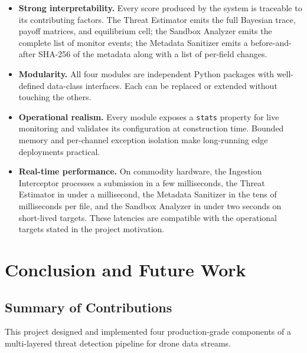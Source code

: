 \documentclass[12pt, a4paper]{report}
\begin{document}
\begin{itemize}
    \item \textbf{Strong interpretability.} Every score produced by the
          system is traceable to its contributing factors. The Threat
          Estimator emits the full Bayesian trace, payoff matrices,
          and equilibrium cell; the Sandbox Analyzer emits the complete
          list of monitor events; the Metadata Sanitizer emits a
          before-and-after SHA-256 of the metadata along with a list of
          per-field changes.
    \item \textbf{Modularity.} All four modules are independent Python
          packages with well-defined data-class interfaces. Each can
          be replaced or extended without touching the others.
    \item \textbf{Operational realism.} Every module exposes a
          \texttt{stats} property for live monitoring and validates its
          configuration at construction time. Bounded memory and
          per-channel exception isolation make long-running edge
          deployments practical.
    \item \textbf{Real-time performance.} On commodity hardware, the
          Ingestion Interceptor processes a submission in a few
          milliseconds, the Threat Estimator in under a millisecond,
          the Metadata Sanitizer in the tens of milliseconds per file,
          and the Sandbox Analyzer in under two seconds on short-lived
          targets. These latencies are compatible with the operational
          targets stated in the project motivation.
\end{itemize}

\cleardoublepage


\chapter{Conclusion and Future Work}
\label{chap:conclusion}

\section{Summary of Contributions}

This project designed and implemented four production-grade components
of a multi-layered threat detection pipeline for drone data streams.
\end{document}
